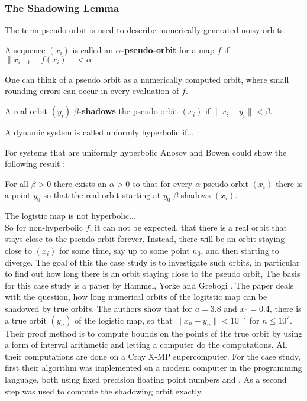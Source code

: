  \subsubsection{The Shadowing Lemma}
 The term pseudo-orbit is used to describe numerically generated noisy orbits. 
 \begin{definition}\label{def:pseudoorbit}
 A sequence $(x_i)$ is called an \textbf{$\alpha$-pseudo-orbit} for a map $f$ if
 $ \| x_{i+1} - f(x_i) \| < \alpha $  
 \end{definition}
 One can think of a pseudo orbit as a numerically computed orbit, where small rounding errors can occur in every evaluation of $f$.
  \begin{definition}\label{def:shadowing}
	A real orbit $(y_i)$ \textbf{$\beta$-shadows} the pseudo-orbit $(x_i)$ if 
	$\| x_i - y_i \| < \beta$.  
 \end{definition}
 \begin{definition}
 A dynamic system is called unformly hyperbolic if...
 \end{definition}
  For systems that are uniformly hyperbolic Anosov and Bowen could show the following result \cite{anosov1967} \cite{Bowen1975}:
  \begin{theorem}
  For all $\beta > 0$ there exists an $\alpha > 0$ so that for every $\alpha$-pseudo-orbit $(x_i)$ there is a point $y_0$ so that the real orbit starting at $y_0$ $\beta$-shadows $(x_i)$.
  \end{theorem} 
  The logistic map is not hyperbolic...\\
  So for non-hyperbolic $f$, it can not be expected, that there is a real orbit that stays close to the pseudo orbit forever.
  Instead, there will be an orbit staying close to $(x_i)$ for some time, say up to some point $n_0$, and then starting to diverge. 
  The goal of this the case study is to investigate such orbits, in particular to find out how long there is an orbit staying close to the pseudo orbit,
  The basis for this case study is a paper by Hammel, Yorke and Grebogi  \cite{Hammel1987}. 
  The paper deals with the question, how long numerical orbits of the logitstic map can be shadowed by true orbits.
  The authors show that for $a = 3.8$ and $x_0 = 0.4$, there is a true orbit $(y_n)$ of the logistic map, so that $\| x_n - y_n \| < 10^{-7}$ for $n \leq 10^7$.
  Their proof method is to compute bounds on the points of the true orbit by using a form of interval arithmetic and letting a computer do the computations. 
  All their computations are done on a Cray X-MP supercomputer. 
  For the case study, first their algorithm was implemented on a modern computer in the \cc programming language, both using fixed precision floating point numbers and \irram. 
  As a second step \irram was used to compute the shadowing orbit exactly.
